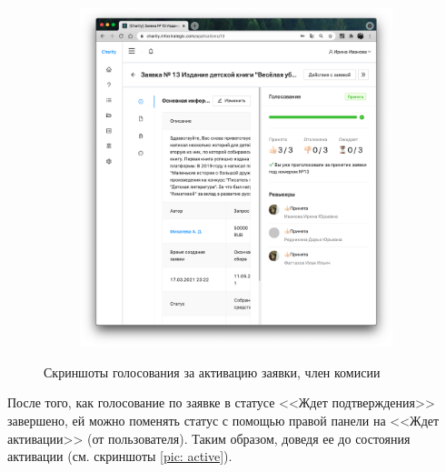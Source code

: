 \documentclass[a4paper,12pt,reqno]{article}
\begin{document}
\begin{figure}[H]
\begin{subfigure}[b]{0.475\linewidth}
		\end{subfigure}
		\begin{subfigure}[b]{0.475\linewidth}
			\includegraphics[width=\linewidth]{img/ro/vote_accepted.png}
		\end{subfigure}
		\caption{Скриншоты голосования за активацию заявки, член комисии}
		\label{pic: vote}
	\end{figure}
	
	После того, как голосование по заявке в статусе <<Ждет подтверждения>> завершено, ей можно поменять статус с помощью правой панели на <<Ждет активации>> (от пользователя). Таким образом, доведя ее до состояния активации (см. скриншоты \ref{pic: active}).
	
\end{document}

